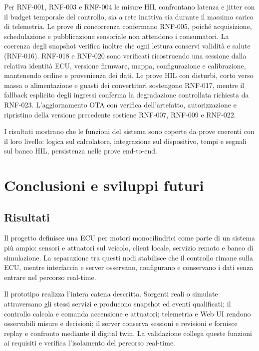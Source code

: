\documentclass{article}
\begin{document}
Per RNF-001, RNF-003 e RNF-004 le misure HIL confrontano latenza e jitter con il
budget temporale del controllo, sia a rete inattiva sia durante il massimo carico
di telemetria. Le prove di concorrenza confermano RNF-005, poiché acquisizione,
schedulazione e pubblicazione sensoriale non attendono i consumatori. La coerenza
degli snapshot verifica inoltre che ogni lettura conservi validità e salute
(RNF-016). RNF-018 e RNF-020 sono verificati ricostruendo una sessione dalla
relativa identità ECU, versione firmware, mappa, configurazione e calibrazione,
mantenendo ordine e provenienza dei dati. Le prove HIL con disturbi, corto verso
massa o alimentazione e guasti dei convertitori sostengono RNF-017, mentre il
fallback esplicito degli ingressi conferma la degradazione controllata richiesta
da RNF-023. L'aggiornamento OTA con verifica dell'artefatto, autorizzazione e
ripristino della versione precedente sostiene RNF-007, RNF-009 e RNF-022.

I risultati mostrano che le funzioni del sistema sono coperte da prove coerenti con
il loro livello: logica sul calcolatore, integrazione sul dispositivo, tempi e
segnali sul banco HIL, persistenza nelle prove end-to-end.

\section{Conclusioni e sviluppi futuri}
\label{sec:conclusioni}

\subsection{Risultati}

Il progetto definisce una ECU per motori monocilindrici come parte di un sistema
più ampio: sensori e attuatori sul veicolo, client locale, servizio remoto e
banco di simulazione. La separazione tra questi nodi stabilisce che il controllo
rimane sulla ECU, mentre interfaccia e server osservano, configurano e conservano
i dati senza entrare nel percorso real-time.

Il prototipo realizza l'intera catena descritta. Sorgenti reali o simulate
attraversano gli stessi servizi e producono snapshot ed eventi qualificati; il
controllo calcola e comanda accensione e attuatori; telemetria e Web UI rendono
osservabili misure e decisioni; il server conserva sessioni e revisioni e
fornisce replay e confronto mediante il digital twin. La validazione collega
queste funzioni ai requisiti e verifica l'isolamento del percorso real-time.
\end{document}
